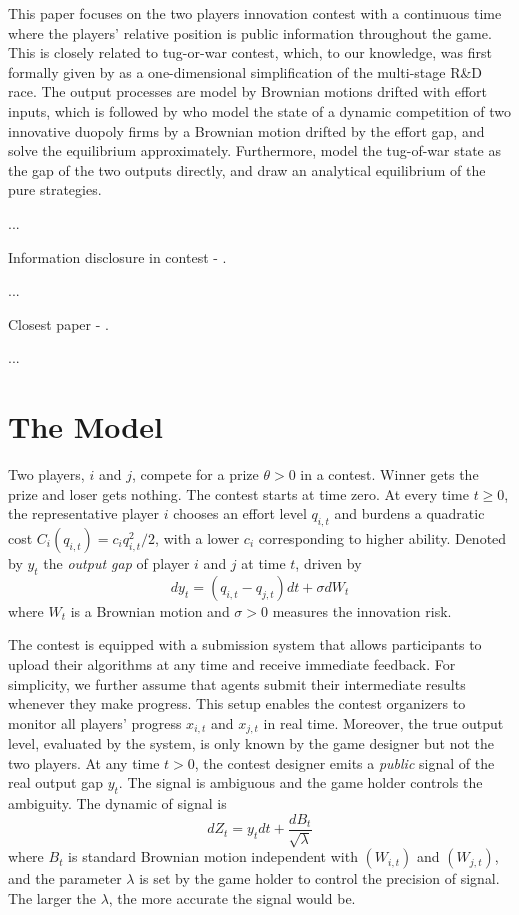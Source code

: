 \documentclass[mnsc]{informs3}
\begin{document}
This paper focuses on the two players innovation contest with a continuous time  where the players’ relative position is public information throughout the game.
This is closely related to tug-or-war contest, which, to our knowledge, was first formally given by \citet{Harris1987Race} as a one-dimensional simplification of the multi-stage R\&D race. 
The output processes are model by Brownian motions drifted with effort inputs, which is followed by \cite{budd1993model} who model the state of a dynamic competition of two innovative duopoly firms by a Brownian motion drifted by the effort gap, and solve the equilibrium approximately. 
Furthermore, \citet{Moscarini2011Contest} model the tug-of-war state as the gap of the two outputs directly, and draw an analytical equilibrium of the pure strategies. 

...

Information disclosure in contest - \cite{Bimpikis2019Contest}. 

...

Closest paper - \cite{ryvkin2022fight}.

...




\section{The Model}

Two players, $i$ and $j$, compete for a prize $\theta>0$ in a contest. 
Winner gets the prize and loser gets nothing. 
The contest starts at time zero. 
At every time $t\ge0$, the representative player $i$ chooses an effort level $q_{i,t}$ and burdens a quadratic cost $C_i(q_{i,t}) = c_i q_{i,t}^2/2$, with a lower $c_i$ corresponding to higher ability. 
Denoted by $y_t$ the \textit{output gap} of player $i$ and $j$ at time $t$, driven by
\begin{equation}\label{eq-state-dynamics}
	dy_t = (q_{i,t}-q_{j,t})dt + \sigma dW_t
\end{equation}
where $W_t$ is a Brownian motion and $\sigma>0$ measures the innovation risk.

The contest is equipped with a submission system that allows participants to upload their algorithms at any time and receive immediate feedback. 
For simplicity, we further assume that agents submit their intermediate results whenever they make progress. 
This setup enables the contest organizers to monitor all players’ progress $x_{i,t}$ and $x_{j,t}$ in real time. 
Moreover, the true output level, evaluated by the system, is only known by the game designer but not the two players. 
At any time $t>0$, the contest designer emits a \textit{public} signal of the real output gap $y_t$. 
The signal is ambiguous and the game holder controls the ambiguity. 
The dynamic of signal is  
\begin{equation}\label{signal}
	dZ_{t} = y_{t}dt + \frac{dB_{t}}{\sqrt{\lambda}} 
\end{equation}
where $B_{t}$ is standard Brownian motion independent with $(W_{i,t})$ and $(W_{j,t})$, and the parameter $\lambda$ is set by the game holder to control the precision of signal. 
The larger the $\lambda$, the more accurate the signal would be. 
\end{document}
